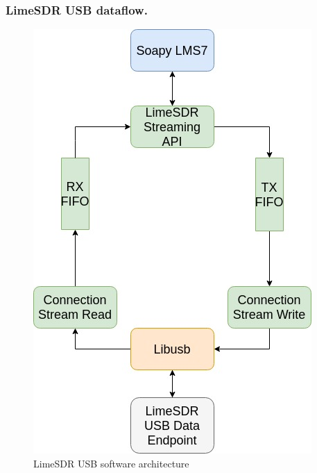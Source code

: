 \subsubsection{LimeSDR USB dataflow.}
\begin{figure}[h!]
\centering
\includegraphics[scale=0.6]{Figure/Software_Architecture.jpg}
\caption{LimeSDR USB software architecture}
\end{figure}

